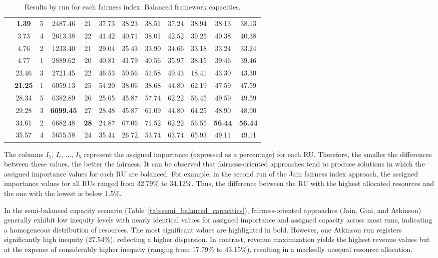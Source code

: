 \documentclass[preprint,12pt]{elsarticle}
\begin{document}
\begin{table}[htbp]
\begin{adjustbox}{max width=\textwidth}
\begin{tabular}{|c|c|c|c|c|c|c|c|c|c|c|c|}
\parbox[t]{2mm}{} & \textbf{1.39 } & 5 & 2487.46 & 21 & 37.73 & 38.23 & 38.51 & 37.24 & 38.94 & 38.13 & 38.13 \\
& 3.73 & 4 & 2613.38 & 22 & 41.42 & 40.71 & 38.01 & 42.52 & 39.25 & 40.38 & 40.38 \\
& 4.76 & 2 & 1233.40 & 21 & 29.04 & 35.43 & 33.90 & 34.66 & 33.18 & 33.24 & 33.24 \\ 
& 4.77 & 1 & 2889.62 & 20 & 40.81 & 41.79 & 40.56 & 35.97 & 38.15 & 39.46 & 39.46 \\ 
& 23.46 & 3 & 2721.45 & 22 & 46.53 & 50.56 & 51.58 & 49.43 & 18.41 & 43.30 & 43.30 \\ \hline

\parbox[t]{2mm}{} & \textbf{21.25} & 1 & 6059.13 & 25 & 54.20 & 38.06 & 38.68 & 44.80 & 62.19 & 47.59 & 47.59 \\ 
& 28.34 & 5 & 6382.89 & 26 & 25.65 & 45.87 & 57.74 & 62.22 & 56.45 & 49.59 & 49.59 \\ 
& 29.28 & 3 & \textbf{6699.45} & 27 & 28.48 & 45.87 & 61.09 & 44.80 & 64.25 & 48.90 & 48.90 \\ 
& 34.61 & 2 & 6682.48 & \textbf{28} & 24.87 & 67.06 & 71.52 & 62.22 & 56.55 & \textbf{56.44} & \textbf{56.44} \\
& 35.57 & 4 & 5655.58 & 24 & 35.44 & 26.72 & 53.74 & 63.74 & 65.93 & 49.11 & 49.11 \\ \hline
\end{tabular}
\end{adjustbox}
\caption{Results by run for each fairness index. Balanced framework capacities.}
\label{tab:balanced_capacities}
\end{table}

The columns $I_1$, $I_i$, ..., $I_5$ represent the assigned importance (expressed as a percentage) for each RU. Therefore, the smaller the differences between these values, the better the fairness. It can be observed that fairness-oriented approaches tend to produce solutions in which the assigned importance values for each RU are balanced. For example, in the second run of the Jain fairness index approach, the assigned importance values for all RUs ranged from 32.79\% to 34.12\%. Thus, the difference between the RU with the highest allocated resources and the one with the lowest is below 1.5\%.

In the semi-balanced capacity scenario (Table~\ref{tab:semi_balanced_capacities}), fairness-oriented approaches (Jain, Gini, and Atkinson) generally exhibit low inequity levels with nearly identical values for assigned importance and assigned capacity across most runs, indicating a homogeneous distribution of resources. The most significant values are highlighted in bold. However, one Atkinson run registers significantly high inequity (27.54\%), reflecting a higher dispersion. In contrast, revenue maximization yields the highest revenue values but at the expense of considerably higher inequity (ranging from 17.79\% to 43.15\%), resulting in a markedly unequal resource allocation.
\end{document}
